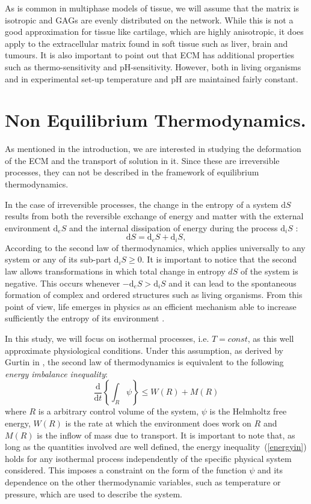 \documentclass[runningheads]{llncs}
\renewcommand{\d}{\ensuremath{\text{d}}}
\begin{document}
As is common in multiphase models of tissue, we will assume that the matrix is isotropic and GAGs are evenly distributed on the network. While this is not a good approximation for tissue like cartilage, which are highly anisotropic, it does apply to the extracellular matrix found in soft tissue such as liver, brain and tumours. It is also important to point out that ECM has additional properties such as thermo-sensitivity and pH-sensitivity. However, both in living organisms and in experimental set-up temperature and pH are maintained fairly constant.

\section{Non Equilibrium Thermodynamics.}
\label{secNET}
As mentioned in the introduction, we are interested in studying the deformation of the ECM and the transport of solution in it. Since these are irreversible processes, they can not be described in the framework of equilibrium thermodynamics. 

In the case of irreversible processes, the change in the entropy of a system $\d S$ results from both the reversible exchange of energy and matter with the external environment $\d_eS$ and the internal dissipation of energy during the process $\d_iS$ \cite{NET}:
\begin{equation}
\d S = \d_eS + \d_iS, 
\end{equation}
According to the second law of thermodynamics, which applies universally to any system or any of its sub-part $\d_i S\ge 0$. It is important to notice that the second law allows transformations in which total change in entropy $d S$ of the system is negative. This occurs whenever $-\d_e S>\d_i S$ and it can lead to the spontaneous formation of complex and ordered structures such as living organisms. From this point of view, life emerges in physics as an efficient mechanism able to increase sufficiently the entropy of its environment \cite{JeremyEngland}.  

In this study, we will focus on isothermal processes, i.e. $T=const$, as this well approximate physiological conditions. Under this assumption, as derived by Gurtin in \cite{GURTIN}, the second law of thermodynamics is equivalent to the following \textit{energy imbalance inequality}:
\begin{equation}
\frac{\d}{\d t} \left\{\int_R \psi \right\}\leq W(R) + M(R) \label{energyin}
\end{equation}
where $R$ is a arbitrary control volume of the system, $\psi$ is the Helmholtz free energy, $W(R)$ is the rate at which the environment does work on $R$ and $M(R)$ is the inflow of mass due to transport. It is important to note that, as long as the quantities involved are well defined, the energy inequality~(\ref{energyin}) holds for any isothermal process independently of the specific physical system considered. This imposes a constraint on the form of the function $\psi$ and its dependence on the other thermodynamic variables, such as temperature or pressure, which are used to describe the system. 
\end{document}
